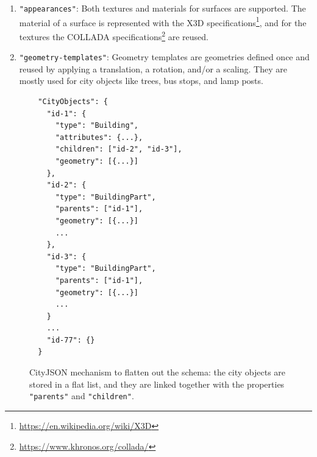 \documentclass{isprs} %
\newcommand{\eg}{eg}
\begin{document}
\begin{enumerate}
  There are several advantages to this approach.
  First, the files can be compressed: 3D vertices are often shared by several surfaces, and repeating them can be costly, especially if they are very precise (sub-millimetre precision is often used).
  Second, this approach increases the topological relationships that are explicitly stored in the file, and several operations (\eg\ determining building adjacency) can be sped up and made more robust.
  Third, it is very easy to convert all coordinates to a representation listing; the inverse is not true. 
  However, this list of vertices is the reason why the streaming of geometries is problematic, since in practice it can contain several millions vertices.
  To be able to reconstruct a single Building, all the \texttt{"vertices"} need to loaded in memory, which can mean waiting for millions of unused vertices to be deserialised.
  \item \texttt{"appearances"}: Both textures and materials for surfaces are supported.  
  The material of a surface is represented with the X3D specifications\footnote{\url{https://en.wikipedia.org/wiki/X3D}}, and for the textures the COLLADA specifications\footnote{\url{https://www.khronos.org/collada/}} are reused.
  \item \texttt{"geometry-templates"}: 
  Geometry templates are geometries defined once and reused by applying a translation, a rotation, and/or a scaling.
  They are mostly used for city objects like trees, bus stops, and lamp posts. 
\end{enumerate}


\begin{figure}
  \centering
\begin{lstlisting}
  "CityObjects": {
    "id-1": {
      "type": "Building",
      "attributes": {...},
      "children": ["id-2", "id-3"],
      "geometry": [{...}]
    },
    "id-2": {
      "type": "BuildingPart",
      "parents": ["id-1"],
      "geometry": [{...}]
      ...
    },
    "id-3": {
      "type": "BuildingPart",
      "parents": ["id-1"],
      "geometry": [{...}]
      ...
    }
    ...
    "id-77": {}
  }
\end{lstlisting}
  \caption{CityJSON mechanism to flatten out the schema: the city objects are stored in a flat list, and they are linked together with the properties \texttt{"parents"} and \texttt{"children"}.}%
\label{fig:parents_children}
\end{figure}




%
\end{document}
